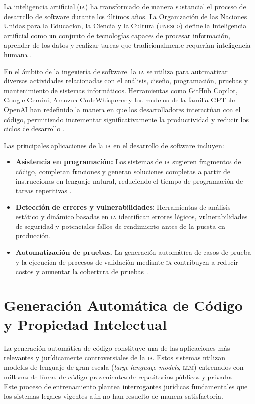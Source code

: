 \documentclass[11pt,a4paper]{report}
\begin{document}
La inteligencia artificial (\textsc{ia}) ha transformado de manera sustancial el proceso de desarrollo de software durante los últimos años. La Organización de las Naciones Unidas para la Educación, la Ciencia y la Cultura (\textsc{unesco}) define la inteligencia artificial como un conjunto de tecnologías capaces de procesar información, aprender de los datos y realizar tareas que tradicionalmente requerían inteligencia humana \citep{unesco2021}.

En el ámbito de la ingeniería de software, la \textsc{ia} se utiliza para automatizar diversas actividades relacionadas con el análisis, diseño, programación, pruebas y mantenimiento de sistemas informáticos. Herramientas como GitHub Copilot, Google Gemini, Amazon CodeWhisperer y los modelos de la familia GPT de OpenAI han redefinido la manera en que los desarrolladores interactúan con el código, permitiendo incrementar significativamente la productividad y reducir los ciclos de desarrollo \citep{github2024, openai2025}.

Las principales aplicaciones de la \textsc{ia} en el desarrollo de software incluyen:

\begin{itemize}[leftmargin=*]
    \item \textbf{Asistencia en programación:} Los sistemas de \textsc{ia} sugieren fragmentos de código, completan funciones y generan soluciones completas a partir de instrucciones en lenguaje natural, reduciendo el tiempo de programación de tareas repetitivas \citep{github2024}.
    \item \textbf{Detección de errores y vulnerabilidades:} Herramientas de análisis estático y dinámico basadas en \textsc{ia} identifican errores lógicos, vulnerabilidades de seguridad y potenciales fallos de rendimiento antes de la puesta en producción.
    \item \textbf{Automatización de pruebas:} La generación automática de casos de prueba y la ejecución de procesos de validación mediante \textsc{ia} contribuyen a reducir costos y aumentar la cobertura de pruebas \citep{openai2025}.
\end{itemize}

\section{Generación Automática de Código y Propiedad Intelectual}

La generación automática de código constituye una de las aplicaciones más relevantes y jurídicamente controversiales de la \textsc{ia}. Estos sistemas utilizan modelos de lenguaje de gran escala (\textit{large language models}, \textsc{llm}) entrenados con millones de líneas de código provenientes de repositorios públicos y privados \citep{openai2025}. Este proceso de entrenamiento plantea interrogantes jurídicas fundamentales que los sistemas legales vigentes aún no han resuelto de manera satisfactoria.
\end{document}
